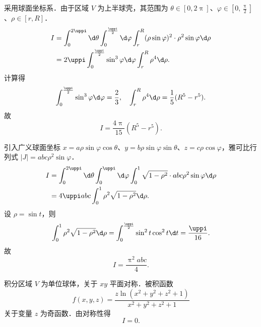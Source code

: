 \begin{solution}
    采用球面坐标系．由于区域 $V$ 为上半球壳，其范围为 $\theta \in [0, 2\uppi]$、$\varphi \in [0, \frac{\uppi}{2}]$、$\rho \in [r, R]$．
    \begin{equation}
        \begin{aligned}
            I & = \int_{0}^{2\uppi} \d \theta \int_{0}^{\frac{\uppi}{2}} \d \varphi \int_{r}^{R} (\rho \sin \varphi)^{2} \cdot \rho^{2} \sin \varphi \d \rho \\
              & = 2\uppi \int_{0}^{\frac{\uppi}{2}} \sin^{3} \varphi \d \varphi \int_{r}^{R} \rho^{4} \d \rho.
        \end{aligned}
    \end{equation}
    计算得
    \begin{equation}
        \int_{0}^{\frac{\uppi}{2}} \sin^{3} \varphi \d \varphi = \frac{2}{3}, \quad \int_{r}^{R} \rho^{4} \d \rho = \frac{1}{5} (R^{5} - r^{5}).
    \end{equation}
    故
    \begin{equation}
        \boxed{I = \frac{4\uppi}{15} (R^{5} - r^{5})}.
    \end{equation}

    引入广义球面坐标 $x = a \rho \sin \varphi \cos \theta$、$y = b \rho \sin \varphi \sin \theta$、$z = c \rho \cos \varphi$，雅可比行列式 $|J| = abc \rho^{2} \sin \varphi$．
    \begin{equation}
        \begin{aligned}
            I & = \int_{0}^{2\uppi} \d \theta \int_{0}^{\uppi} \d \varphi \int_{0}^{1} \sqrt{1 - \rho^{2}} \cdot abc \rho^{2} \sin \varphi \d \rho \\
              & = 4\uppi abc \int_{0}^{1} \rho^{2} \sqrt{1 - \rho^{2}} \d \rho.
        \end{aligned}
    \end{equation}
    设 $\rho = \sin t$，则
    \begin{equation}
        \int_{0}^{1} \rho^{2} \sqrt{1 - \rho^{2}} \d \rho = \int_{0}^{\frac{\uppi}{2}} \sin^{2} t \cos^{2} t \d t = \frac{\uppi}{16}.
    \end{equation}
    故
    \begin{equation}
        \boxed{I = \frac{\uppi^{2} abc}{4}}.
    \end{equation}

    积分区域 $V$ 为单位球体，关于 $xy$ 平面对称．被积函数
    \begin{equation}
        f(x, y, z) = \frac{z \ln(x^{2} + y^{2} + z^{2} + 1)}{x^{2} + y^{2} + z^{2} + 1}
    \end{equation}
    关于变量 $z$ 为奇函数．由对称性得
    \begin{equation}
        \boxed{I = 0}.
    \end{equation}
\end{solution}

